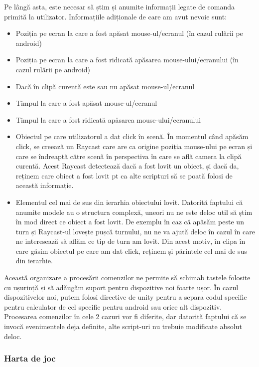 \documentclass[12pt, a4paper]{article}
\begin{document}
	Pe lângă asta, este necesar să știm și anumite informații legate de comanda primită la utilizator. Informațiile adiționale de care am avut nevoie sunt:
	
	\begin{itemize}
		\item Poziția pe ecran la care a fost apăsat mouse-ul/ecranul (în cazul rulării pe android)
		\item Poziția pe ecran la care a fost ridicată apăsarea mouse-ului/ecranului (în cazul rulării pe android)
		\item Dacă în clipă curentă este sau nu apăsat mouse-ul/ecranul
		\item Timpul la care a fost apăsat mouse-ul/ecranul
		\item Timpul la care a fost ridicată apăsarea mouse-ului/ecranului
		\item Obiectul pe care utilizatorul a dat click în scenă. În momentul când apăsăm click, se creează un Raycast care are ca origine poziția mouse-ului pe ecran și care se îndreaptă către scenă în perspectiva în care se află camera la clipă curentă. Acest Raycast detectează dacă a fost lovit un obiect, și dacă da, reținem care obiect a fost lovit pt ca alte scripturi să se poată folosi de această informație.
		\item Elementul cel mai de sus din ierarhia obiectului lovit. Datorită faptului că anumite modele au o structura complexă, uneori nu ne este deloc util să știm în mod direct ce obiect a fost lovit. De exemplu în caz că apăsăm peste un turn și Raycast-ul lovește pușcă turnului, nu ne va ajută deloc în cazul în care ne interesează să aflăm ce tip de turn am lovit. Din acest motiv, în clipa în care găsim obiectul pe care am dat click, reținem și părintele cel mai de sus din ierarhie.
	\end{itemize}
	
	Această organizare a procesării comenzilor ne permite să schimab tastele folosite cu ușurință și să adăugăm suport pentru dispozitive noi foarte ușor. În cazul dispozitivelor noi, putem folosi directive de unity pentru a separa codul specific pentru calculator de cel specific pentru android sau orice alt dispozitiv. Procesarea comenzilor în cele 2 cazuri vor fi diferite, dar datorită faptului că se invocă evenimentele deja definite, alte script-uri nu trebuie modificate absolut deloc.
	
	
	
	
	
	\subsubsection{Harta de joc}
	
\end{document}
